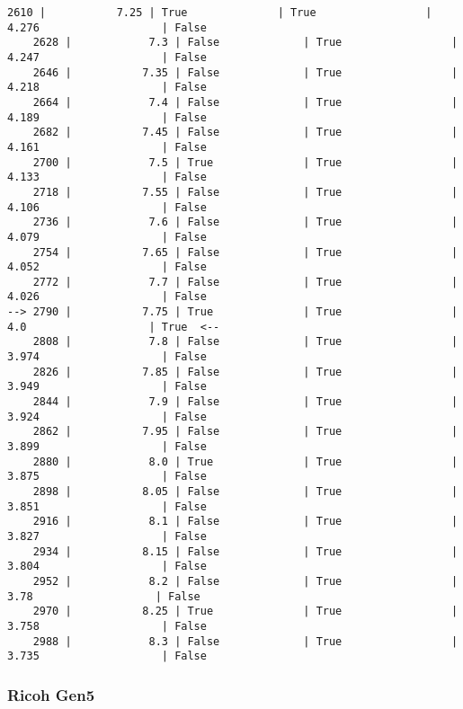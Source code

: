 \documentclass{article}
\begin{document}
\begin{Verbatim}[commandchars=\\\{\}]
    2610 |           7.25 | True              | True                 |   4.276                   | False
    2628 |            7.3 | False             | True                 |   4.247                   | False
    2646 |           7.35 | False             | True                 |   4.218                   | False
    2664 |            7.4 | False             | True                 |   4.189                   | False
    2682 |           7.45 | False             | True                 |   4.161                   | False
    2700 |            7.5 | True              | True                 |   4.133                   | False
    2718 |           7.55 | False             | True                 |   4.106                   | False
    2736 |            7.6 | False             | True                 |   4.079                   | False
    2754 |           7.65 | False             | True                 |   4.052                   | False
    2772 |            7.7 | False             | True                 |   4.026                   | False
--> 2790 |           7.75 | True              | True                 |     4.0                   | True  <--
    2808 |            7.8 | False             | True                 |   3.974                   | False
    2826 |           7.85 | False             | True                 |   3.949                   | False
    2844 |            7.9 | False             | True                 |   3.924                   | False
    2862 |           7.95 | False             | True                 |   3.899                   | False
    2880 |            8.0 | True              | True                 |   3.875                   | False
    2898 |           8.05 | False             | True                 |   3.851                   | False
    2916 |            8.1 | False             | True                 |   3.827                   | False
    2934 |           8.15 | False             | True                 |   3.804                   | False
    2952 |            8.2 | False             | True                 |    3.78                   | False
    2970 |           8.25 | True              | True                 |   3.758                   | False
    2988 |            8.3 | False             | True                 |   3.735                   | False
    \end{Verbatim}

    \subsubsection{Ricoh Gen5}\label{ricoh-gen5}
\end{document}

